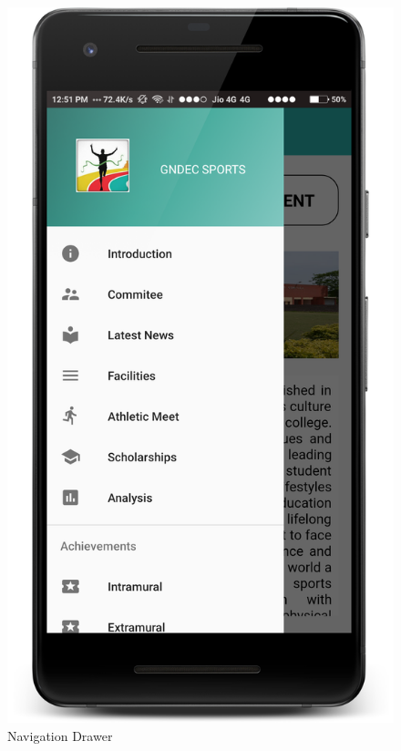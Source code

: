 \begin{figure}[ht]
\centering
\includegraphics[scale=0.20]{images/S9.png}
\caption{Navigation Drawer}
\end{figure}

\newpage

